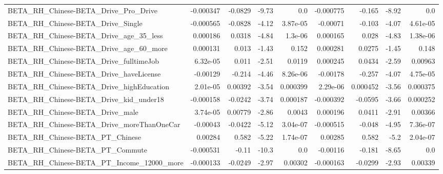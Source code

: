 \begin{tabular}{lrrrrrrrr}
BETA\_RH\_Chinese-BETA\_Drive\_Pro\_Drive               &   -0.000347 &      -0.0829 &     -9.73 &      0.0 &  -0.000775 &      -0.165 &        -8.92 &           0.0 \\
BETA\_RH\_Chinese-BETA\_Drive\_Single                  &   -0.000565 &      -0.0828 &     -4.12 & 3.87e-05 &   -0.00071 &      -0.103 &        -4.07 &      4.61e-05 \\
BETA\_RH\_Chinese-BETA\_Drive\_age\_35\_less             &    0.000186 &       0.0318 &     -4.84 &  1.3e-06 &   0.000165 &       0.028 &        -4.83 &      1.38e-06 \\
BETA\_RH\_Chinese-BETA\_Drive\_age\_60\_more             &    0.000131 &        0.013 &     -1.43 &    0.152 &   0.000281 &      0.0275 &        -1.45 &         0.148 \\
BETA\_RH\_Chinese-BETA\_Drive\_fulltimeJob             &    6.32e-05 &        0.011 &     -2.51 &   0.0119 &   0.000245 &      0.0434 &        -2.59 &       0.00963 \\
BETA\_RH\_Chinese-BETA\_Drive\_haveLicense             &    -0.00129 &       -0.214 &     -4.46 & 8.26e-06 &   -0.00178 &      -0.257 &        -4.07 &      4.75e-05 \\
BETA\_RH\_Chinese-BETA\_Drive\_highEducation           &    2.01e-05 &      0.00392 &     -3.54 & 0.000399 &   2.29e-06 &    0.000452 &        -3.56 &      0.000375 \\
BETA\_RH\_Chinese-BETA\_Drive\_kid\_under18             &   -0.000158 &      -0.0242 &     -3.74 & 0.000187 &  -0.000392 &     -0.0595 &        -3.66 &      0.000252 \\
BETA\_RH\_Chinese-BETA\_Drive\_male                    &    3.74e-05 &      0.00779 &     -2.86 &   0.0043 &   0.000196 &      0.0411 &        -2.91 &       0.00366 \\
BETA\_RH\_Chinese-BETA\_Drive\_moreThanOneCar          &    -0.00043 &      -0.0422 &     -5.12 & 3.04e-07 &  -0.000515 &      -0.048 &        -4.95 &      7.36e-07 \\
BETA\_RH\_Chinese-BETA\_PT\_Chinese                    &     0.00284 &        0.582 &     -5.22 & 1.74e-07 &    0.00285 &       0.582 &         -5.2 &      2.04e-07 \\
BETA\_RH\_Chinese-BETA\_PT\_Commute                    &   -0.000531 &        -0.11 &     -10.3 &      0.0 &   -0.00116 &      -0.181 &        -8.65 &           0.0 \\
BETA\_RH\_Chinese-BETA\_PT\_Income\_12000\_more          &   -0.000133 &      -0.0249 &     -2.97 &  0.00302 &  -0.000163 &     -0.0299 &        -2.93 &       0.00339 \\

\end{tabular}
